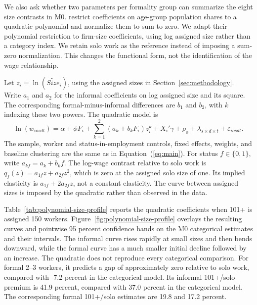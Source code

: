 We also ask whether two parameters per formality group can summarize the
eight size contrasts in M0.
\citet{FairDominguez1991} restrict coefficients on age-group population
shares to a quadratic polynomial and normalize them to sum to zero.
We adapt their polynomial restriction to firm-size coefficients, using log
assigned size rather than a category index. We retain solo work as the
reference instead of imposing a sum-zero normalization. This changes the
functional form, not the identification of the wage relationship.

Let \(z_i=\ln(\widetilde{Size}_i)\), using the assigned sizes in
Section~\ref{sec:methodology}. Write \(a_1\) and \(a_2\) for the informal
coefficients on log assigned size and its square. The corresponding
formal-minus-informal differences are \(b_1\) and \(b_2\), with \(k\)
indexing these two powers. The quadratic model is
\begin{equation}\label{eq:polynomial-size-profile}
  \ln(w_{iosdt})=\alpha+\phi F_i
  +\sum_{k=1}^{2}(a_k+b_k F_i)z_i^k
  +X_i'\gamma+\rho_o+\lambda_{s\times d\times t}
  +\varepsilon_{iosdt}.
\end{equation}
The sample, worker and status-in-employment controls, fixed effects, weights,
and baseline clustering are the same as in Equation~(\ref{eq:main}). For status
\(f\in\{0,1\}\), write \(a_{kf}=a_k+b_k f\). The log-wage contrast
relative to solo work is \(q_f(z)=a_{1f}z+a_{2f}z^2\), which is zero at
the assigned solo size of one. Its implied elasticity is
\(a_{1f}+2a_{2f}z\), not a constant elasticity. The curve between assigned
sizes is imposed by the quadratic rather than observed in the data.



Table~\ref{tab:polynomial-size-profile} reports the quadratic coefficients
when 101+ is assigned 150 workers. Figure~\ref{fig:polynomial-size-profile}
overlays the resulting curves and pointwise 95 percent confidence bands on
the M0 categorical estimates and their intervals. The informal curve
rises rapidly at small sizes and then bends downward, while the formal curve
has a much smaller initial decline followed by an increase. The quadratic
does not reproduce every categorical comparison. For formal 2--3 workers,
it predicts a gap of approximately zero relative to solo work, compared with -7.2 percent
in the categorical model. Its informal 101+/solo premium is 41.9 percent,
compared with 37.0 percent in the categorical model. The corresponding formal
101+/solo estimates are 19.8 and 17.2 percent.

